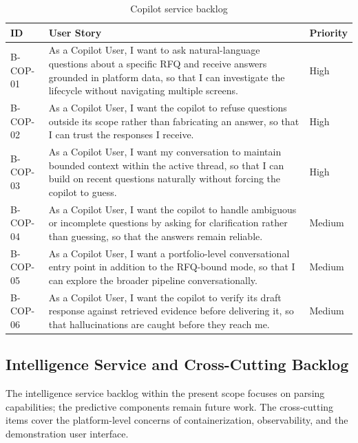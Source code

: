 \begin{table}[H]
\centering
\renewcommand{\arraystretch}{1.3}
\begin{tabular}{|p{1.4cm}|p{10.6cm}|p{1.5cm}|}
\hline
\rowcolor{lightgray}
\textbf{ID} & \textbf{User Story} & \textbf{Priority} \\ \hline
B-COP-01 & As a Copilot User, I want to ask natural-language questions about a specific RFQ and receive answers grounded in platform data, so that I can investigate the lifecycle without navigating multiple screens. & High \\ \hline
B-COP-02 & As a Copilot User, I want the copilot to refuse questions outside its scope rather than fabricating an answer, so that I can trust the responses I receive. & High \\ \hline
B-COP-03 & As a Copilot User, I want my conversation to maintain bounded context within the active thread, so that I can build on recent questions naturally without forcing the copilot to guess. & High \\ \hline
B-COP-04 & As a Copilot User, I want the copilot to handle ambiguous or incomplete questions by asking for clarification rather than guessing, so that the answers remain reliable. & Medium \\ \hline
B-COP-05 & As a Copilot User, I want a portfolio-level conversational entry point in addition to the RFQ-bound mode, so that I can explore the broader pipeline conversationally. & Medium \\ \hline
B-COP-06 & As a Copilot User, I want the copilot to verify its draft response against retrieved evidence before delivering it, so that hallucinations are caught before they reach me. & Medium \\ \hline
\end{tabular}
\caption{Copilot service backlog}
\label{tab:backlog_copilot}
\end{table}

\subsection*{Intelligence Service and Cross-Cutting Backlog}
The intelligence service backlog within the present scope focuses on parsing capabilities; the predictive components remain future work. The cross-cutting items cover the platform-level concerns of containerization, observability, and the demonstration user interface.

